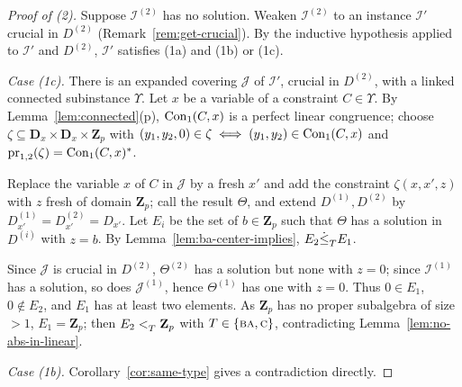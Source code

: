 \begin{proof}[Proof of \textup{(2)}]
Suppose $\mathcal I^{(2)}$ has no solution. Weaken $\mathcal I^{(2)}$ to an
instance $\mathcal I'$ crucial in $D^{(2)}$ (Remark~\ref{rem:get-crucial}). By
the inductive hypothesis applied to $\mathcal I'$ and $D^{(2)}$, $\mathcal I'$
satisfies (1a) and (1b) or (1c).

\emph{Case \textup{(1c)}.} There is an expanded covering $\mathcal J$ of
$\mathcal I'$, crucial in $D^{(2)}$, with a linked connected subinstance
$\Upsilon$. Let $x$ be a variable of a constraint $C\in\Upsilon$. By
Lemma~\ref{lem:connected}(p), $\operatorname{Con}_1(C,x)$ is a perfect linear congruence;
choose $\zeta\subseteq\mathbf D_{x}\times\mathbf D_{x}\times\mathbf Z_{p}$ with
$(y_{1},y_{2},0)\in\zeta\iff(y_{1},y_{2})\in\operatorname{Con}_1(C,x)$ and
$\operatorname*{pr}_{1,2}(\zeta)=\operatorname{Con}_1(C,x)^{*}$.

Replace the variable $x$ of $C$ in $\mathcal J$ by a fresh $x'$ and add the
constraint $\zeta(x,x',z)$ with $z$ fresh of domain $\mathbf Z_{p}$; call the
result $\Theta$, and extend $D^{(1)},D^{(2)}$ by $D^{(1)}_{x'}=D^{(2)}_{x'}
=D_{x'}$. Let $E_{i}$ be the set of $b\in\mathbf Z_{p}$ such that $\Theta$ has
a solution in $D^{(i)}$ with $z=b$. By
Lemma~\ref{lem:ba-center-implies}, $E_{2}\dot\le_{T}^{}E_{1}$.

Since $\mathcal J$ is crucial in $D^{(2)}$, $\Theta^{(2)}$ has a solution but
none with $z=0$; since $\mathcal I^{(1)}$ has a solution, so does
$\mathcal J^{(1)}$, hence $\Theta^{(1)}$ has one with $z=0$. Thus
$0\in E_{1}$, $0\notin E_{2}$, and $E_{1}$ has at least two elements. As
$\mathbf Z_{p}$ has no proper subalgebra of size $>1$, $E_{1}=\mathbf Z_{p}$;
then $E_{2}<_{T}^{}\mathbf Z_{p}$ with $T\in\{\textup{\textsc{ba}},\textup{\textsc{c}}\}$, contradicting
Lemma~\ref{lem:no-abs-in-linear}.

\emph{Case \textup{(1b)}.} Corollary~\ref{cor:same-type} gives a
contradiction directly.
\end{proof}

